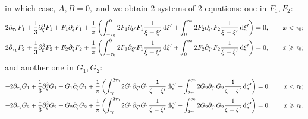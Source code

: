 \documentclass[10pt,reqno,oneside,a4paper, landscape]{article}
\begin{document}
in which case, $A, B = 0,$ and we obtain 2 systems of 2 equations: one in $F_1, F_2:$
\begin{equation}\label{HLSystemF}
\begin{aligned}
2 \partial_{\tau_1}F_1 + \frac{1}{3} \partial_\xi^3 F_1 + F_1\partial_\xi F_1 + \frac{1}{\pi} \left(\int^0_{-\tau_0} 2 F_1 \partial_{\xi'} F_1 \frac{1}{\xi -\xi'} \,\mathrm{d} \xi' + \int^{\infty}_{0} 2 F_2 \partial_{\xi'} F_2 \frac{1}{\xi -\xi'} \,\mathrm{d} \xi' \right) &= 0, \qquad x < \tau_0; \\
2 \partial_{\tau_1}F_2 + \frac{1}{3} \partial_\xi^3 F_2 + F_2\partial_\xi F_2 + \frac{1}{\pi}  \left( \int^0_{-\tau_0} 2 F_1 \partial_{\xi'} F_1 \frac{1}{\xi -\xi'} \,\mathrm{d} \xi' + \int^{\infty}_{0} 2 F_2 \partial_{\xi'} F_2 \frac{1}{\xi -\xi'} \,\mathrm{d} \xi' \right) &= 0, \qquad x \geqslant \tau_0;
\end{aligned}
\end{equation}
and another one in $G_1, G_2:$
\begin{equation}\label{HLSystemG}
\begin{aligned}
- 2 \partial_{\tau_1} G_1 +  \frac{1}{3} \partial_\zeta^3 G_1+ G_1 \partial_{\zeta} G_1  +  \frac{1}{\pi} \left( \int^{2\tau_0}_{\tau_0} 2 G_1 \partial_{\zeta'} G_1 \frac{1}{\zeta -\zeta'} \,\mathrm{d} \zeta' + \int^{\infty}_{2\tau_0} 2 G_2 \partial_{\zeta'} G_2 \frac{1}{\zeta -\zeta'} \,\mathrm{d} \zeta' \right) &= 0, \qquad x < \tau_0; \\
- 2 \partial_{\tau_1} G_2 +  \frac{1}{3} \partial_\zeta^3 G_2+ G_2 \partial_{\zeta} G_2  + \frac{1}{\pi} \left( \int^{2\tau_0}_{\tau_0} 2 G_1 \partial_{\zeta'} G_1 \frac{1}{\zeta -\zeta'} \,\mathrm{d} \zeta' + \int^{\infty}_{2\tau_0} 2 G_2 \partial_{\zeta'} G_2 \frac{1}{\zeta -\zeta'} \,\mathrm{d} \zeta' \right) &= 0, \qquad x \geqslant \tau_0.
\end{aligned}
\end{equation}
\end{document}
